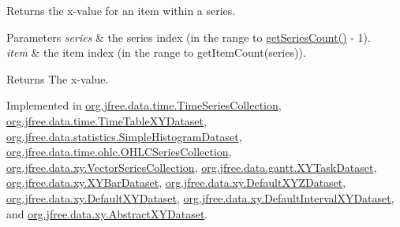 Returns the x-\/value for an item within a series.


\begin{DoxyParams}{Parameters}
{\em series} & the series index (in the range {} to {\ttfamily \mbox{\hyperlink{interfaceorg_1_1jfree_1_1data_1_1general_1_1_series_dataset_a84fe822f5918f941d9de1ed1b73c9f58}{get\+Series\+Count()}} -\/ 1}). \\
\hline
{\em item} & the item index (in the range {} to {\ttfamily get\+Item\+Count(series)}).\\
\hline
\end{DoxyParams}
\begin{DoxyReturn}{Returns}
The x-\/value. 
\end{DoxyReturn}


Implemented in \mbox{\hyperlink{classorg_1_1jfree_1_1data_1_1time_1_1_time_series_collection_af4c7434196da5c1658c8eb7e24580733}{org.\+jfree.\+data.\+time.\+Time\+Series\+Collection}}, \mbox{\hyperlink{classorg_1_1jfree_1_1data_1_1time_1_1_time_table_x_y_dataset_a74bc9da96ff2a538f8753d2abc2588b0}{org.\+jfree.\+data.\+time.\+Time\+Table\+X\+Y\+Dataset}}, \mbox{\hyperlink{classorg_1_1jfree_1_1data_1_1statistics_1_1_simple_histogram_dataset_abe5b334c787c634308cfd38c39be0a22}{org.\+jfree.\+data.\+statistics.\+Simple\+Histogram\+Dataset}}, \mbox{\hyperlink{classorg_1_1jfree_1_1data_1_1time_1_1ohlc_1_1_o_h_l_c_series_collection_a528dc828a917fd0ba0fb959cacbaead1}{org.\+jfree.\+data.\+time.\+ohlc.\+O\+H\+L\+C\+Series\+Collection}}, \mbox{\hyperlink{classorg_1_1jfree_1_1data_1_1xy_1_1_vector_series_collection_a94c0b22e67110c43fb565a756b1c89e9}{org.\+jfree.\+data.\+xy.\+Vector\+Series\+Collection}}, \mbox{\hyperlink{classorg_1_1jfree_1_1data_1_1gantt_1_1_x_y_task_dataset_aa4e0735ca3ef93d31ff25870ddead3c2}{org.\+jfree.\+data.\+gantt.\+X\+Y\+Task\+Dataset}}, \mbox{\hyperlink{classorg_1_1jfree_1_1data_1_1xy_1_1_x_y_bar_dataset_a84dba23fe8e4a19faff04e32a4bc0ea3}{org.\+jfree.\+data.\+xy.\+X\+Y\+Bar\+Dataset}}, \mbox{\hyperlink{classorg_1_1jfree_1_1data_1_1xy_1_1_default_x_y_z_dataset_a595c9b15046e75687ad4cc5f7b6a4617}{org.\+jfree.\+data.\+xy.\+Default\+X\+Y\+Z\+Dataset}}, \mbox{\hyperlink{classorg_1_1jfree_1_1data_1_1xy_1_1_default_x_y_dataset_a8b2261dd2265af0d085c4889ae519521}{org.\+jfree.\+data.\+xy.\+Default\+X\+Y\+Dataset}}, \mbox{\hyperlink{classorg_1_1jfree_1_1data_1_1xy_1_1_default_interval_x_y_dataset_aecdfbb6de5b66cf970a8849b4a88efe9}{org.\+jfree.\+data.\+xy.\+Default\+Interval\+X\+Y\+Dataset}}, and \mbox{\hyperlink{classorg_1_1jfree_1_1data_1_1xy_1_1_abstract_x_y_dataset_a0d74392c194073e586d8a039767c622f}{org.\+jfree.\+data.\+xy.\+Abstract\+X\+Y\+Dataset}}.

